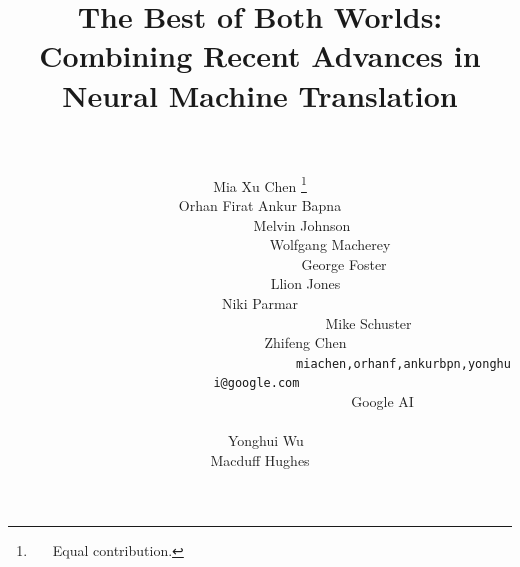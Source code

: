 \documentclass[11pt,a4paper]{article}
\title{The Best of Both Worlds: \\Combining Recent Advances in Neural Machine Translation\\
~}
\author{
Mia Xu Chen \thanks{~~~Equal contribution.}\\\And 
Orhan Firat \samethanks[1] \And 
Ankur Bapna \samethanks[1] \vspace*{-10cm} \\\AND 
~~~~~~~~~~~~Melvin Johnson\\ \And
~~~~~~~~~~~~~~~~~~~~Wolfgang Macherey\\\And 
~~~~~~~~~~~~~~~~~~~~~~~~George Foster\\\And 
~~~~~~~~~~~~~Llion Jones\\\And
 Niki Parmar \\\AND 
~~~~~~~~~~~~~~~~~~~~~~~~~~~~~~~Mike Schuster\\\And
~~~~~~~~~~~~~Zhifeng Chen\vspace{0.2cm}\\
~~~~~~~~~~~~~~~~~~~~~~~~~~~~~~~~~~~~~~~~~{\tt miachen,orhanf,ankurbpn,yonghui@google.com }\vspace{0.2cm}\\
~~~~~~~~~~~~~~~~~~~~~~~~~~~~~~~~~~~Google AI\\
~\\~
\And 
\hspace{-1.2cm} Yonghui Wu\\\And
\hspace{-3.2cm}Macduff Hughes
}
\begin{document}
\maketitle


\begin{abstract}



\end{abstract}
\end{document}
